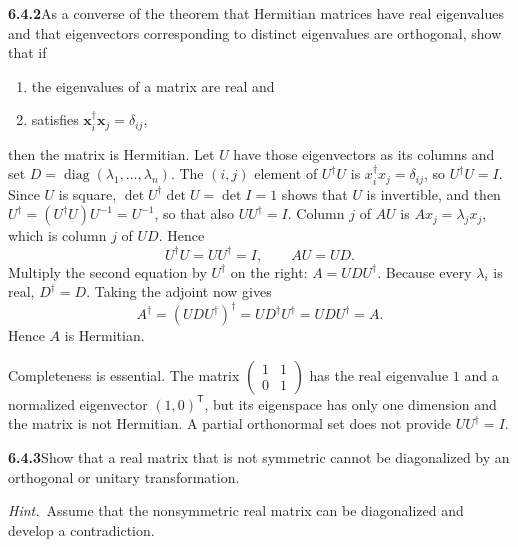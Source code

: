 \par\bigskip
\noindent\textbf{6.4.2}\quad As a converse of the theorem that Hermitian
matrices have real eigenvalues and that eigenvectors corresponding to
distinct eigenvalues are orthogonal, show that if
\begin{enumerate}
\item[(a)] the eigenvalues of a matrix are real and
\item[(b)] 
  satisfies $\mathbf{x}_{i}^{\dagger}\mathbf{x}_{j}=\delta_{ij}$,
\end{enumerate}
then the matrix is Hermitian.
\solution
{}
Let $U$ have those eigenvectors as its columns and set
$D=\operatorname{diag}(\lambda_1,\ldots,\lambda_n)$. The $(i,j)$
element of $U^\dagger U$ is $x_i^\dagger x_j=\delta_{ij}$, so
$U^\dagger U=I$. Since $U$ is square, $\det U^\dagger\det U=\det I=1$
shows that $U$ is invertible, and then
$U^\dagger=(U^\dagger U)U^{-1}=U^{-1}$, so that also $UU^\dagger=I$.
Column $j$ of $AU$ is $Ax_j=\lambda_jx_j$,
which is column $j$ of $UD$. Hence
\[
U^\dagger U=UU^\dagger=I,\qquad AU=UD.
\]
Multiply the second equation by $U^\dagger$ on the right:
$A=UDU^\dagger$. Because every $\lambda_i$ is real, $D^\dagger=D$.
Taking the adjoint now gives
\[
A^\dagger=(UDU^\dagger)^\dagger
=UD^\dagger U^\dagger=UDU^\dagger=A.
\]
Hence $A$ is Hermitian.

Completeness is essential. The matrix
$\begin{pmatrix}1&1\\0&1\end{pmatrix}$ has the real eigenvalue $1$ and
a normalized eigenvector $(1,0)^{\mathsf T}$, but its eigenspace has
only one dimension and the matrix is not Hermitian. A partial
orthonormal set does not provide $UU^\dagger=I$.

\par\bigskip
\noindent\textbf{6.4.3}\quad Show that a real matrix that is not symmetric
cannot be diagonalized by an orthogonal or unitary transformation.

\emph{Hint.}~Assume that the nonsymmetric real matrix can be diagonalized and
develop a contradiction.
\solution
{}

